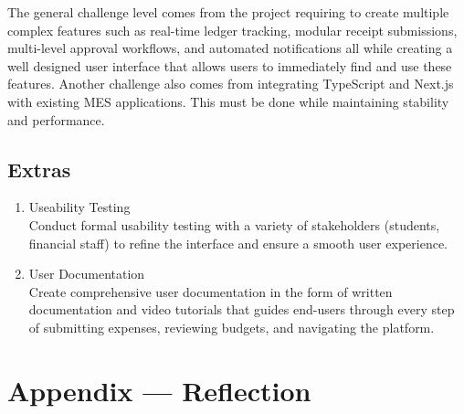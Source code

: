 \documentclass{article}
\begin{document}
\hspace{0.5cm}The general challenge level comes from the project requiring to create multiple complex features such as 
real-time ledger tracking, modular receipt submissions, multi-level approval workflows, and automated 
notifications all while creating a well designed user interface that allows users to immediately find 
and use these features. Another challenge also comes from integrating TypeScript and Next.js with existing 
MES applications. This must be done while maintaining stability and performance. 

\subsection{Extras}

\begin{enumerate}
    \item Useability Testing \\
    Conduct formal usability testing with a variety of stakeholders (students, financial staff) to refine the interface and ensure a smooth user experience.
    \item User Documentation \\
    Create comprehensive user documentation in the form of written documentation and video tutorials that guides end-users through every step of submitting expenses, reviewing budgets, and navigating the platform.
\end{enumerate}

\newpage{}

\section*{Appendix --- Reflection}


\end{document}
